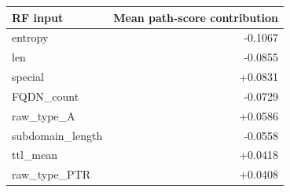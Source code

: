 \centering\footnotesize
\begin{tabular}{@{}lr@{}}
\toprule
RF input & Mean path-score contribution\\\midrule
entropy & -0.1067\\
len & -0.0855\\
special & +0.0831\\
FQDN\_count & -0.0729\\
raw\_type\_A & +0.0586\\
subdomain\_length & -0.0558\\
ttl\_mean & +0.0418\\
raw\_type\_PTR & +0.0408\\
\bottomrule
\end{tabular}
